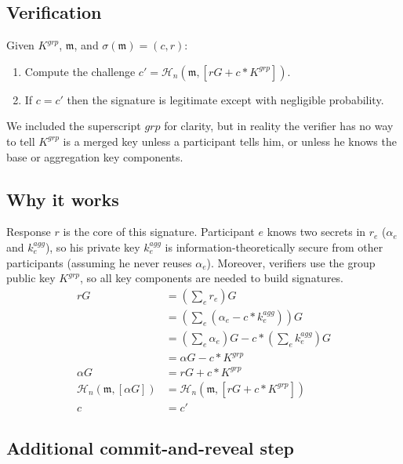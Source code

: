\subsection*{Verification}

Given $K^{grp}$, $\mathfrak{m}$, and $\sigma(\mathfrak{m}) = (c,r)$:
\begin{enumerate}
    \item Compute the challenge $c' = \mathcal{H}_n(\mathfrak{m},[r G + c*K^{grp}])$.
    \item If $c = c'$ then the signature is legitimate except with negligible probability.
\end{enumerate}

We included the superscript $grp$ for clarity, but in reality the verifier has no way to tell $K^{grp}$ is a merged key unless a participant tells him, or unless he knows the base or aggregation key components.


\subsection*{Why it works}

Response $r$ is the core of this signature. Participant $e$ knows two secrets in $r_e$ ($\alpha_e$ and $k^{agg}_e$), so his private key $k^{agg}_e$ is information-theoretically secure from other participants (assuming he never reuses $\alpha_e$). Moreover, verifiers use the group public key $K^{grp}$, so all key components are needed to build signatures.
\begin{align*}
    r G &= (\sum_e r_e) G \\
      &= (\sum_e (\alpha_e - c*k^{agg}_e)) G \\
      &= (\sum_e \alpha_e) G - c*(\sum_e k^{agg}_e) G \\
      &= \alpha G - c*K^{grp} \\
    \alpha G &= r G + c*K^{grp} \\
    \mathcal{H}_n(\mathfrak{m},[\alpha G]) &= \mathcal{H}_n(\mathfrak{m},[r G + c*K^{grp}]) \\
    c &= c'
\end{align*}


\subsection*{Additional commit-and-reveal step}


